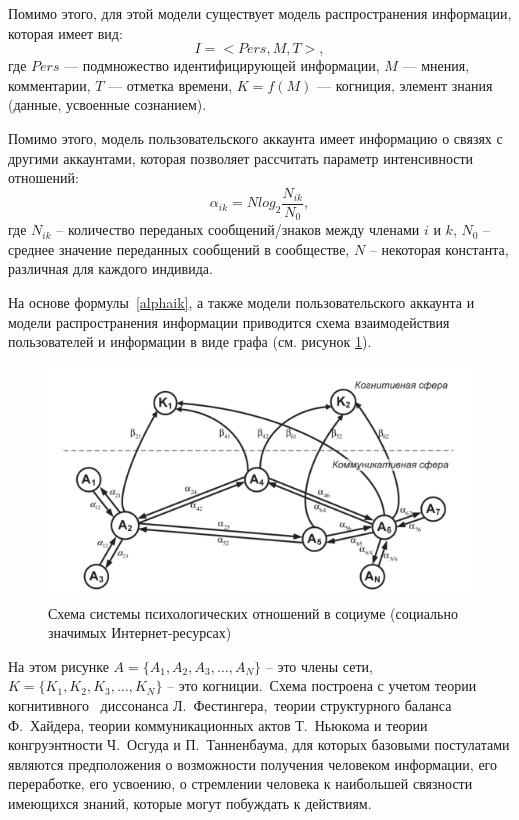 Помимо этого, для этой модели существует модель распространения информации, которая имеет вид:
\begin{equation}
    I = <Pers, M, T>,
\end{equation}
где $Pers$ — подмножество идентифицирующей информации, $M$ — мнения, комментарии,
$T$ — отметка времени, $K = f(M)$ — когниция, элемент знания (данные, усвоенные сознанием).

Помимо этого, модель пользовательского аккаунта имеет информацию о связях с другими аккаунтами,
которая позволяет рассчитать параметр интенсивности отношений:
\begin{equation}\label{alphaik}
    \alpha_{ik} = N log_{2} \frac{N_{ik}}{N_{0}},
\end{equation}
где $N_{ik}$ – количество переданых сообщений/знаков между членами $i$ и $k$,
$N_{0}$ – среднее значение переданных сообщений в сообществе, $N$ – некоторая константа, различная для каждого индивида.

На основе формулы~\ref{alphaik}, а также модели пользовательского аккаунта и модели распространения информации
приводится схема взаимодействия пользователей и информации в виде графа (см. рисунок \ref{fig:shema_system_in_socium}).

\begin{figure}[h!]
    \centering
    \captionsetup{justification=centering}
    \includegraphics[width=0.8\linewidth]{pictures/schema_system_in_socium.png}
    \caption{Схема системы психологических отношений в социуме (социально значимых Интернет-ресурсах)}
    \label{fig:shema_system_in_socium}
\end{figure}

На этом рисунке $A = \{ A_{1}, A_{2}, A_{3}, \dots, A_{N}\}$ – это члены сети,
$K = \{ K_{1}, K_{2}, K_{3}, \dots, K_{N}\}$ – это когниции.~Схема построена с учетом теории когнитивного
~диссонанса Л.~Фестингера,~теории структурного баланса Ф.~Хайдера, теории коммуникационных актов Т.~Ньюкома
и теории конгруэнтности Ч.~Осгуда и П.~Танненбаума, для которых базовыми постулатами являются предположения
о возможности получения человеком информации, его переработке, его усвоению, о стремлении человека к наибольшей
связности имеющихся знаний, которые могут побуждать к действиям.

